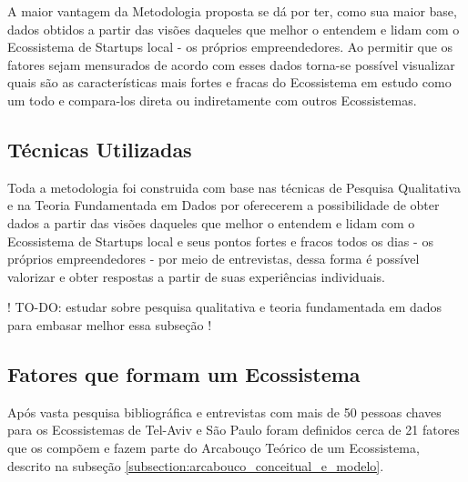 A maior vantagem da Metodologia proposta se dá por ter, como sua maior base, dados obtidos a partir das visões daqueles que melhor o entendem e lidam com o Ecossistema de Startups local - os próprios empreendedores. Ao permitir que os fatores sejam mensurados de acordo com esses dados torna-se possível visualizar quais são as características mais fortes e fracas do Ecossistema em estudo como um todo e compara-los direta ou indiretamente com outros Ecossistemas.

\subsection{Técnicas Utilizadas}
\label{subsection:tecnicas_utilizadas}

Toda a metodologia foi construida com base nas técnicas de Pesquisa Qualitativa e na Teoria Fundamentada em Dados por oferecerem a possibilidade de obter dados a partir das visões daqueles que melhor o entendem e lidam com o Ecossistema de Startups local e seus pontos fortes e fracos todos os dias - os próprios empreendedores - por meio de entrevistas, dessa forma é possível valorizar e obter respostas a partir de suas experiências individuais.

! TO-DO: estudar sobre pesquisa qualitativa e teoria fundamentada em dados para embasar melhor essa subseção !

\subsection{Fatores que formam um Ecossistema}
\label{subsection:fatores_que_formam_um_ecossistema}

Após vasta pesquisa bibliográfica e entrevistas com mais de 50 pessoas chaves para os Ecossistemas de Tel-Aviv e São Paulo foram definidos cerca de 21 fatores que os compõem e fazem parte do Arcabouço Teórico de um Ecossistema, descrito na subseção \ref{subsection:arcabouco_conceitual_e_modelo}. 

